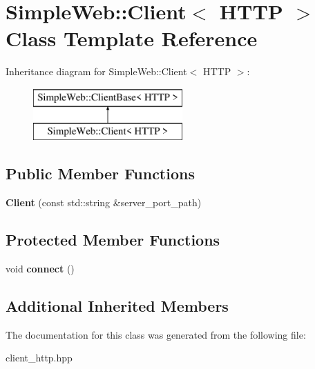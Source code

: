 \hypertarget{a01557}{}\section{Simple\+Web\+:\+:Client$<$ H\+T\+TP $>$ Class Template Reference}
\label{a01557}
Inheritance diagram for Simple\+Web\+:\+:Client$<$ H\+T\+TP $>$\+:\begin{figure}[H]
\begin{center}
\leavevmode
\includegraphics[height=2.000000cm]{a01557}
\end{center}
\end{figure}
\subsection*{Public Member Functions}
\begin{DoxyCompactItemize}
\item 
\mbox{\label{a01557_a47655afc849e459096743876391dae17}} 
{\bfseries Client} (const std\+::string \&server\+\_\+port\+\_\+path)
\end{DoxyCompactItemize}
\subsection*{Protected Member Functions}
\begin{DoxyCompactItemize}
\item 
\mbox{\label{a01557_aebed110274c94b539e2d0a857c24991d}} 
void {\bfseries connect} ()
\end{DoxyCompactItemize}
\subsection*{Additional Inherited Members}


The documentation for this class was generated from the following file\+:\begin{DoxyCompactItemize}
\item 
client\+\_\+http.\+hpp\end{DoxyCompactItemize}
